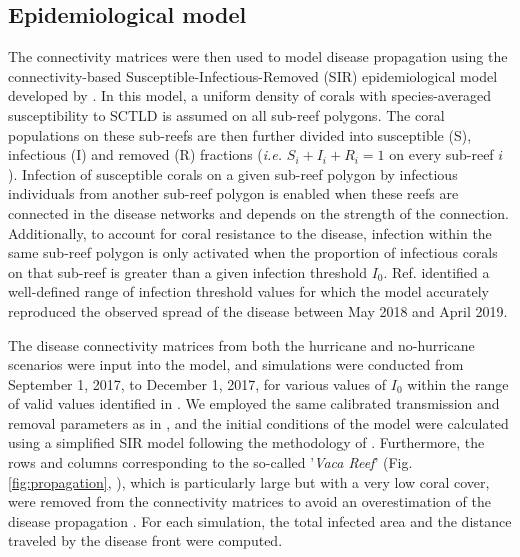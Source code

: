 \documentclass[fleqn,10pt]{wlscirep}
\newcommand{\modif}[1]{{#1}}
\begin{document}
\subsection{Epidemiological model}
The connectivity matrices were then used to model disease propagation using the connectivity-based Susceptible-Infectious-Removed (SIR) epidemiological model developed by \citep{DobbySCTLD}. In this model, \modif{a uniform density of corals with species-averaged susceptibility to SCTLD is assumed on all sub-reef polygons. The coral populations on these sub-reefs are then further divided into susceptible (S), infectious (I) and removed (R) fractions (\textit{i.e.} $S_i+I_i+R_i = 1$ on every sub-reef $i$)}. Infection of susceptible corals on a given sub-reef polygon by infectious individuals from another sub-reef polygon is enabled when these reefs are connected in the disease networks and depends on the strength of the connection. Additionally, to account for coral resistance to the disease, infection within the same sub-reef polygon is only activated when the proportion of infectious corals on that sub-reef is greater than a given infection threshold $I_0$. Ref. \citep{DobbySCTLD} identified a well-defined range of infection threshold values for which the model accurately reproduced the observed spread of the disease between May 2018 and April 2019.

The disease connectivity matrices from both the hurricane and no-hurricane scenarios were input into the model, and simulations were conducted from September 1, 2017, to December 1, 2017, for various values of $I_0$ within the range of valid values identified in \citep{DobbySCTLD}. We employed the same calibrated transmission and removal parameters as in \citep{DobbySCTLD}, and the initial conditions of the model were calculated using a simplified SIR model following the methodology of \citep{DobbySCTLD}. Furthermore, the rows and columns corresponding to the so-called '\textit{Vaca Reef}' (Fig. \ref{fig:propagation}, \citealp{Frys2020}), which is particularly large but with a very low coral cover, were removed from the connectivity matrices to avoid an overestimation of the disease propagation \cite{DobbySCTLD}. For each simulation, the total infected area and the distance traveled by the disease front were computed.

\end{document}
